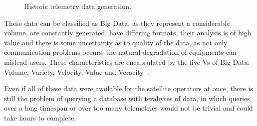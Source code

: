 \begin{figure}[!htb]
  \caption{Historic telemetry data generation.}\label{fig:totaldatagen}
  \vspace{4mm}
  \begin{center}
  \end{center}
  \vspace{2mm}
\end{figure}

These data can be classified as Big Data, as they represent a considerable volume, are constantly generated, have differing formats, their analysis is of high value and there is some uncertainty as to quality of the data, as not only communication problems occurs, the natural degradation of equipments can mislead users.
These characteristics are encapsulated by the five Vs of Big Data: Volume, Variety, Velocity, Value and Veracity~\cite{kacfahemaniUnderstandableBigData2015}.

Even if all of these data were available for the satellite operators at once, there is still the problem of querying a database with terabytes of data, in which queries over a long timespan or over too many telemetries would not be trivial and could take hours to complete.

